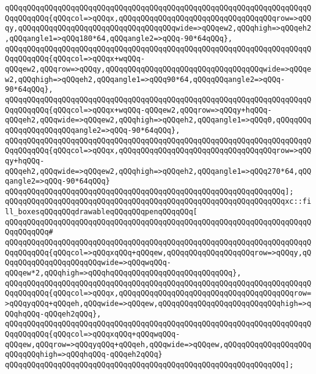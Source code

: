 \verb|qQQqqQQqqQQqqQQqqQQqqQQqqQQqqQQqqQQqqQQqqQQqqQQqqQQqqQQqqQQqqQQqqQQqqQQqqQQqqQQq{qQQqcol=>qQQqx,qQQqqQQqqQQqqQQqqQQqqQQqqQQqqQQqqQQqrow=>qQQqy,qQQqqQQqqQQqqQQqqQQqqQQqqQQqqQQqqQQqwide=>qQQqew2,qQQqhigh=>qQQqeh2,qQQqangle1=>qQQq180*64,qQQqangle2=>qQQq-90*64qQQq},|\newline
\verb|qQQqqQQqqQQqqQQqqQQqqQQqqQQqqQQqqQQqqQQqqQQqqQQqqQQqqQQqqQQqqQQqqQQqqQQqqQQqqQQq{qQQqcol=>qQQqx+wqQQq-qQQqew2,qQQqrow=>qQQqy,qQQqqQQqqQQqqQQqqQQqqQQqqQQqqQQqqQQqwide=>qQQqew2,qQQqhigh=>qQQqeh2,qQQqangle1=>qQQq90*64,qQQqqQQqangle2=>qQQq-90*64qQQq},|\newline
\verb|qQQqqQQqqQQqqQQqqQQqqQQqqQQqqQQqqQQqqQQqqQQqqQQqqQQqqQQqqQQqqQQqqQQqqQQqqQQqqQQq{qQQqcol=>qQQqx+wqQQq-qQQqew2,qQQqrow=>qQQqy+hqQQq-qQQqeh2,qQQqwide=>qQQqew2,qQQqhigh=>qQQqeh2,qQQqangle1=>qQQq0,qQQqqQQqqQQqqQQqqQQqqQQqangle2=>qQQq-90*64qQQq},|\newline
\verb|qQQqqQQqqQQqqQQqqQQqqQQqqQQqqQQqqQQqqQQqqQQqqQQqqQQqqQQqqQQqqQQqqQQqqQQqqQQqqQQq{qQQqcol=>qQQqx,qQQqqQQqqQQqqQQqqQQqqQQqqQQqqQQqqQQqrow=>qQQqy+hqQQq-qQQqeh2,qQQqwide=>qQQqew2,qQQqhigh=>qQQqeh2,qQQqangle1=>qQQq270*64,qQQqangle2=>qQQq-90*64qQQq}|\newline
\verb|qQQqqQQqqQQqqQQqqQQqqQQqqQQqqQQqqQQqqQQqqQQqqQQqqQQqqQQqqQQqqQQq];|\newline
\newline
\verb|qQQqqQQqqQQqqQQqqQQqqQQqqQQqqQQqqQQqqQQqqQQqqQQqqQQqqQQqqQQqqQQqxc::fill_boxesqQQqqQQqdrawableqQQqqQQqpenqQQqqQQq[|\newline
\verb|qQQqqQQqqQQqqQQqqQQqqQQqqQQqqQQqqQQqqQQqqQQqqQQqqQQqqQQqqQQqqQQqqQQqqQQqqQQqqQQq#|\newline
\verb|qQQqqQQqqQQqqQQqqQQqqQQqqQQqqQQqqQQqqQQqqQQqqQQqqQQqqQQqqQQqqQQqqQQqqQQqqQQqqQQq{qQQqcol=>qQQqxqQQq+qQQqew,qQQqqQQqqQQqqQQqqQQqrow=>qQQqy,qQQqqQQqqQQqqQQqqQQqqQQqwide=>qQQqwqQQq-qQQqew*2,qQQqhigh=>qQQqhqQQqqQQqqQQqqQQqqQQqqQQqqQQq},|\newline
\verb|qQQqqQQqqQQqqQQqqQQqqQQqqQQqqQQqqQQqqQQqqQQqqQQqqQQqqQQqqQQqqQQqqQQqqQQqqQQqqQQq{qQQqcol=>qQQqx,qQQqqQQqqQQqqQQqqQQqqQQqqQQqqQQqqQQqqQQqrow=>qQQqyqQQq+qQQqeh,qQQqwide=>qQQqew,qQQqqQQqqQQqqQQqqQQqqQQqqQQqhigh=>qQQqhqQQq-qQQqeh2qQQq},|\newline
\verb|qQQqqQQqqQQqqQQqqQQqqQQqqQQqqQQqqQQqqQQqqQQqqQQqqQQqqQQqqQQqqQQqqQQqqQQqqQQqqQQq{qQQqcol=>qQQqxqQQq+qQQqwqQQq-qQQqew,qQQqrow=>qQQqyqQQq+qQQqeh,qQQqwide=>qQQqew,qQQqqQQqqQQqqQQqqQQqqQQqqQQqhigh=>qQQqhqQQq-qQQqeh2qQQq}|\newline
\verb|qQQqqQQqqQQqqQQqqQQqqQQqqQQqqQQqqQQqqQQqqQQqqQQqqQQqqQQqqQQqqQQq];|\newline

